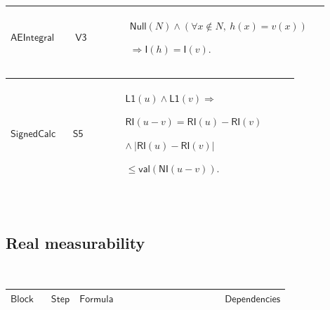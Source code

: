 \documentclass[12pt,reqno]{amsart}
\theoremstyle{blueplain}
\numberwithin{equation}{section}
\newlength{\DCTOneColumnBody}
\begin{document}
{\scriptsize \setlength{\parskip}{0pt}\nointerlineskip
\noindent 
\begin{tabular}{|@{}>{\centering\arraybackslash}m{0.19251\linewidth}|>{\centering\arraybackslash}m{0.16845\linewidth}|>{\centering\arraybackslash}m{0.53904\linewidth}|}
\hline
\hypertarget{dctlem:AEIntegral}{$\displaystyle \mathsf{AEIntegral}$} & 
\hyperlink{dct:V3}{$\displaystyle \mathsf{V3}$} & $\displaystyle \mathsf{Null%
}(N)\land(\forall x\notin N,\ h(x)=v(x))$\par$\displaystyle \Rightarrow%
\mathsf{I}(h)=\mathsf{I}(v).$ \\ \hline
\end{tabular}%
}

{\scriptsize \setlength{\parskip}{0pt}\nointerlineskip
\noindent 
\begin{tabular}{|@{}>{\centering\arraybackslash}m{0.19251\linewidth}|>{\centering\arraybackslash}m{0.16845\linewidth}|>{\centering\arraybackslash}m{0.53904\linewidth}|}
\hline
\hypertarget{dctlem:SignedCalc}{$\displaystyle \mathsf{SignedCalc}$} & 
\hyperlink{dct:S5}{$\displaystyle \mathsf{S5}$} & $\displaystyle \mathsf{L1}%
(u)\land\mathsf{L1}(v)\Rightarrow$\par$\displaystyle \mathsf{RI}(u-v)=%
\mathsf{RI}(u)-\mathsf{RI}(v)$\par$\displaystyle \land\ |\mathsf{RI}(u)-%
\mathsf{RI}(v)|$\par$\displaystyle {}\le\mathsf{val}(\mathsf{NI}(u-v)).$ \\ 
\hline
\end{tabular}%
}

{\scriptsize \ }

\subsection{\protect\scriptsize Real measurability}

{\scriptsize {\ }}

{\scriptsize \setlength{\parskip}{0pt}\nointerlineskip
\noindent 
\begin{tabular}{|@{}>{\centering\arraybackslash}m{\DCTOneColumnBody}|}
\hline
$\displaystyle \mathsf{RealMeasurability}$ \\ \hline
\end{tabular}%
}

{\scriptsize \setlength{\parskip}{0pt}\nointerlineskip
\noindent 
\begin{tabular}{|@{}>{\centering\arraybackslash}m{0.10658\linewidth}|>{\centering\arraybackslash}m{0.03553\linewidth}|>{\centering\arraybackslash}m{0.52105\linewidth}|>{\centering\arraybackslash}m{0.23684\linewidth}|}
\hline
$\displaystyle \mathsf{Block}$ & $\displaystyle \mathsf{Step}$ & $%
\displaystyle \mathsf{Formula}$ & $\displaystyle \mathsf{Dependencies}$ \\ 
\hline
\end{tabular}%
}
\end{document}
